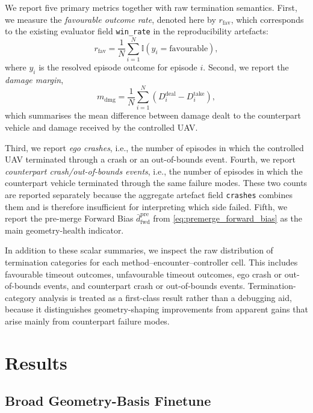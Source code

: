 \documentclass[drones,article,submit,pdftex,moreauthors]{Definitions/mdpi}
\begin{document}
We report five primary metrics together with raw termination semantics. First, we measure the \emph{favourable outcome rate}, denoted here by $r_{\mathrm{fav}}$, which corresponds to the existing evaluator field \texttt{win\_rate} in the reproducibility artefacts:
\begin{equation}
r_{\mathrm{fav}}
=
\frac{1}{N}
\sum_{i=1}^{N}
\mathbb{I}(y_i = \text{favourable}),
\end{equation}
where $y_i$ is the resolved episode outcome for episode $i$. Second, we report the \emph{damage margin},
\begin{equation}
m_{\mathrm{dmg}}
=
\frac{1}{N}
\sum_{i=1}^{N}
\left(
D^{\mathrm{deal}}_i - D^{\mathrm{take}}_i
\right),
\end{equation}
which summarises the mean difference between damage dealt to the counterpart vehicle and damage received by the controlled UAV.

Third, we report \emph{ego crashes}, i.e., the number of episodes in which the controlled UAV terminated through a crash or an out-of-bounds event. Fourth, we report \emph{counterpart crash/out-of-bounds events}, i.e., the number of episodes in which the counterpart vehicle terminated through the same failure modes. These two counts are reported separately because the aggregate artefact field \texttt{crashes} combines them and is therefore insufficient for interpreting which side failed. Fifth, we report the pre-merge Forward Bias $\bar{d}_{\mathrm{fwd}}^{\mathrm{pre}}$ from \eqref{eq:premerge_forward_bias} as the main geometry-health indicator.

In addition to these scalar summaries, we inspect the raw distribution of termination categories for each method--encounter--controller cell. This includes favourable timeout outcomes, unfavourable timeout outcomes, ego crash or out-of-bounds events, and counterpart crash or out-of-bounds events. Termination-category analysis is treated as a first-class result rather than a debugging aid, because it distinguishes geometry-shaping improvements from apparent gains that arise mainly from counterpart failure modes.

\section{Results}

\subsection{Broad Geometry-Basis Finetune}
\end{document}
